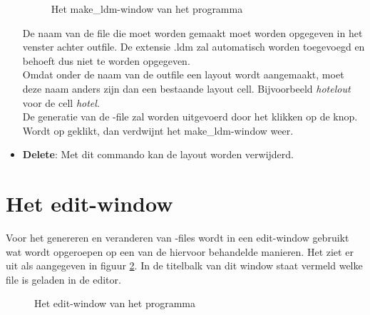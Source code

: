 \begin{itemize}
\begin{figure}[htb]
\centerline{}
\caption{Het make\_ldm-window van het programma }
\label{ldm-window}
\end{figure}

De naam van de file die moet worden gemaakt moet worden opgegeven in
het venster achter outfile. De extensie .ldm zal automatisch worden
toegevoegd en behoeft dus niet te worden opgegeven.\\
Omdat onder de naam van de outfile een layout wordt aangemaakt,
moet deze naam anders zijn dan een bestaande layout cell.
Bijvoorbeeld {\it hotelout} voor de cell {\it hotel}.\\
De generatie van de -file zal worden uitgevoerd door het klikken
op de  knop.\\
Wordt op  geklikt, dan verdwijnt het make\_ldm-window weer.
\item {\bf Delete}:
Met dit commando kan de layout worden verwijderd.
\end{itemize}

\section{Het  edit-window}
\label{edit-section}
Voor het genereren en veranderen van -files wordt in  een
edit-window gebruikt wat wordt opgeroepen op een van de hiervoor behandelde manieren.
Het ziet er uit als aangegeven in figuur \ref{edit-window}.
In de titelbalk van dit window staat vermeld welke file is geladen in de editor.

\begin{figure}[htb]
\centerline{}
\caption{Het edit-window van het programma }
\label{edit-window}
\end{figure}

